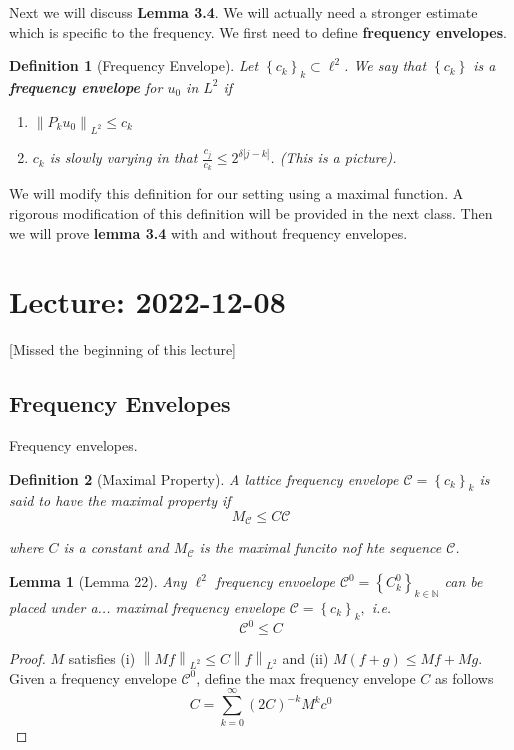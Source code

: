 \documentclass{article}
\newtheorem{definition}{Definition}
\newtheorem{lemma}{Lemma}
\newcommand\norm[1]{\left\lVert#1\right\rVert}
\begin{document}
Next we will discuss \textbf{Lemma 3.4}. We will actually need a stronger
estimate which is specific to the frequency. We first need to define
\textbf{frequency envelopes}.
\begin{definition}[Frequency Envelope]
  \label{def:frequency-envelope}
  Let $\left\{c_{k}\right\}_{k}\subset \ell^{2}$. We say that
  $\left\{c_{k}\right\}$ is a \textbf{frequency envelope} for $u_{0}$ in $L^2$
  if
  \begin{enumerate}
    \item $\norm{P_{k}u_{0}}_{L^2} \leq c_{k}$
    \item $c_{k}$ is \textit{slowly varying} in that $\frac{c_{j}}{c_{k}}\leq 2^{\delta \left| j-k \right|}$. (This is a picture).
  \end{enumerate}
\end{definition}
We will modify this definition for our setting using a maximal function. A
rigorous modification of this definition will be provided in the next class.
Then we will prove \textbf{lemma 3.4} with and without frequency envelopes. 
\section{Lecture: 2022-12-08}
[Missed the beginning of this lecture]

\subsection{Frequency Envelopes}
Frequency envelopes.
\begin{definition}[Maximal Property]
  \label{def:maximal-property}
  A lattice frequency envelope $\mathcal{C}= \left\{c_{k}\right\}_{k}$  is said
  to have the maximal property if
  \begin{equation*}
    M_{\mathcal{C}} \leq  C \mathcal{C}
  \end{equation*}
  
where $C$ is a constant and $M_{\mathcal{C}}$ is the maximal funcito nof hte
sequence $\mathcal{C}$.   
\end{definition}

\begin{lemma}[Lemma 22]
  Any $\ell^{2}$ frequency envoelope $\mathcal{C}^{0}=\left\{ C^{0}_{k}
  \right\}_{k\in \mathbb{N}}$ can be placed under a...  maximal frequency
  envelope $\mathcal{C}= \left\{ c_{k} \right\}_{k},$  i.e.
  \begin{equation*}
    \mathcal{C}^{0}\leq C
  \end{equation*}
\end{lemma}
\begin{proof}
  $M$ satisfies (i) $\norm{Mf}_{L^{2}}\leq C \norm{f}_{L^{2}}$  and (ii)
  $M(f+g) \leq Mf+Mg$.  Given a frequency envelope  $\mathcal{C}^{0}$, define
  the max frequency envelope $C$ as follows
  \begin{equation*}
    C = \sum_{k=0}^{\infty}(2C)^{-k}M^{k}c^{0} 
  \end{equation*}
\end{proof}
\end{document}

